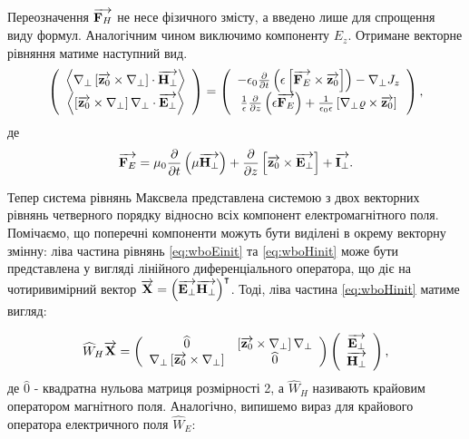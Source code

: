 Переозначення $ \overrightarrow{\mathbf F_H} $ не несе фізичного змісту, а введено лише для 
спрощення виду формул. Аналогічним чином виключимо компоненту $ E_z $. 
Отримане векторне рівняння матиме наступний вид.
%
\begin{equation} \label{eq:wboEinit}
\left( \begin{array}{c} 
\left< \nabla_\perp \left[ \overrightarrow{\mathbf z_0} \times \nabla_\perp \right] \cdot \overrightarrow{\mathbf H_\perp} \right> \\
\left< \left[ \overrightarrow{\mathbf z_0} \times \nabla_\perp \right] \nabla_\perp \cdot \overrightarrow{\mathbf E_\perp} \right> \\
\end{array} \right) = \left( \begin{array}{c} 
- \epsilon_0 \frac{\partial }{\partial t} \left( \epsilon \left[ \overrightarrow{\mathbf F_E} \times \overrightarrow{\mathbf z_0} \right] 
\right) - \nabla_\perp J_z \\
\frac{1}{\epsilon} \frac{\partial }{\partial z} \left( \epsilon \overrightarrow{\mathbf F_E} \right) +
\frac{1}{\epsilon_0 \epsilon} \left[ \nabla_\perp \varrho \times \overrightarrow{\mathbf z_0} \right]
\end{array} \right),
\end{equation}
%
де
%
\begin{equation} \label{eq:F_E}
\overrightarrow{\mathbf F_E} = \mu_0 \frac{\partial }{\partial t} \left( \mu  \overrightarrow{\mathbf H_\perp} \right) +
\frac{\partial }{\partial z} \left[ \overrightarrow{\mathbf z_0} \times \overrightarrow{\mathbf E_\perp} \right] + \overrightarrow{\mathbf I_\perp}.
\end{equation}

Тепер система рівнянь Максвела представлена системою з двох векторних рівнянь 
четверного порядку відносно всіх компонент електромагнітного поля.
Помічаємо, що поперечні компоненти можуть бути виділені в окрему векторну 
змінну: ліва частина рівнянь \eqref{eq:wboEinit} та \eqref{eq:wboHinit} може 
бути представлена у вигляді лінійного диференціального оператора, що діє на
чотиривимірний вектор 
$ \overrightarrow{\mathbf X} = \left( \overrightarrow{\mathbf E_\perp} \overrightarrow{\mathbf H_\perp} \right)^\intercal $. Тоді,
ліва частина \eqref{eq:wboHinit} матиме вигляд:

\begin{equation} \label{eq:W_H}
\widehat{W}_H \overrightarrow{\mathbf X} = \left( \begin{array}{cc} \widehat{0} & 
\left[ \overrightarrow{\mathbf z_0} \times \nabla_\perp \right] \nabla_\perp \\
\nabla_\perp \left[ \overrightarrow{\mathbf z_0} \times \nabla_\perp \right] &
\widehat{0} \\ \end{array} \right) \left( \begin{array}{c} 
\overrightarrow{\mathbf E_\perp} \\ \overrightarrow{\mathbf H_\perp} \\ \end{array} \right),
\end{equation}
%
де $ \widehat{0} $ - квадратна нульова матриця розмірності 2, а 
$ \widehat{W}_H $ називають крайовим оператором магнітного поля. Аналогічно,
випишемо вираз для крайового оператора електричного поля $ \widehat{W}_E $:

